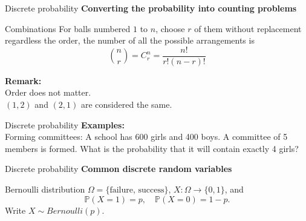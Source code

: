 \documentclass [aspectratio=169]{beamer}
\begin{document}
\begin{frame}{Discrete probability}
\textbf{Converting the probability into counting problems}
\vspace{0.1in}
\begin{block}{Combinations}
For balls numbered $1$ to $n$, choose $r$ of them without replacement regardless the order, the number of all the possible arrangements is 
$$
\binom{n}{r} = C^n_r = \frac{n!}{r!(n - r)!}
$$
\end{block}
\vspace{0.1in}
\textbf{Remark:} \\
Order does not matter.\\
$(1, 2)$ and $(2, 1)$ are considered the same.
\end{frame}




\begin{frame}{Discrete probability}
\textbf{Examples:}\\
Forming committees: A school has 600 girls and 400 boys. A committee of 5 members is formed. What is the probability that it will contain exactly 4 girls?
\vspace{0.1in}
\end{frame}



\begin{frame}{Discrete probability}
\textbf{Common discrete random variables}
\begin{block}{Bernoulli distribution}
$\Omega = \{\text{failure, success}\}$, $X: \Omega \to \{0,1\}$, and
$$
\mathbb{P}(X = 1) = p, \quad \mathbb{P}(X = 0) = 1 - p.
$$
Write $X \sim Bernoulli(p)$.
\end{block}
\vspace{0.1in}
\end{frame}
\end{document}
